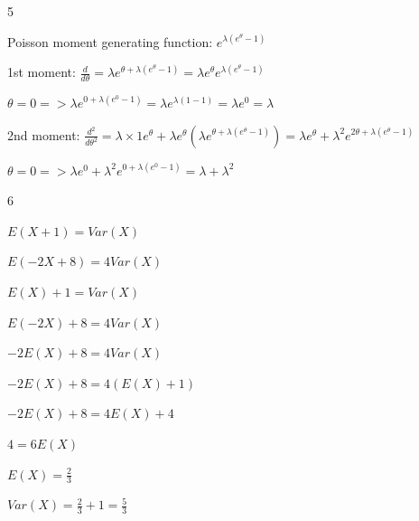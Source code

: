 \documentclass[12 pt]{article}
\begin{document}
    \begin{exercise}{5}
    \hfill

    Poisson moment generating function: $e^{\lambda (e^{\theta}-1)}$

    1st moment: $\frac{d}{d \theta} = {\lambda}e^{\theta + \lambda(e^{\theta}-1)} = \lambda e^{\theta} e^{\lambda(e^{\theta}-1)}$

    $\theta = 0 => \lambda e^{0 + \lambda(e^0 -1)} = \lambda e^{\lambda(1-1)} = \lambda e^0 = \lambda$

    \hfill

    2nd moment: $\frac{d^2}{d{\theta}^2} = \lambda \times 1 e^{\theta} + \lambda e^{\theta}(\lambda e^{\theta + \lambda(e^{\theta} - 1)}) = \lambda e^{\theta} + {\lambda}^2 e^{2 \theta + \lambda(e^{\theta} - 1)}$

    $\theta = 0 => \lambda e^0 + \lambda^2 e^{0 + \lambda(e^0 -1)} = \lambda + {\lambda}^2$

    \hfill
    \end{exercise}


    \begin{exercise}{6}
    \hfill

    $E(X+1) = Var(X)$
    
    $E(-2X+8) = 4 Var(X)$

    \hfill

    $E(X) + 1 = Var(X)$

    \hfill

    $E(-2X) + 8 = 4 Var(X)$

    $-2 E(X) + 8 = 4 Var(X)$

    \hfill

    $-2 E(X) + 8 = 4(E(X) + 1)$

    $-2 E(X) + 8 = 4 E(X) + 4$

    $4 = 6 E(X)$

    $E(X) = \frac{2}{3}$

    \hfill

    $Var(X) = \frac{2}{3} + 1 = \frac{5}{3}$
    
    \hfill    
    \end{exercise}
\end{document}

